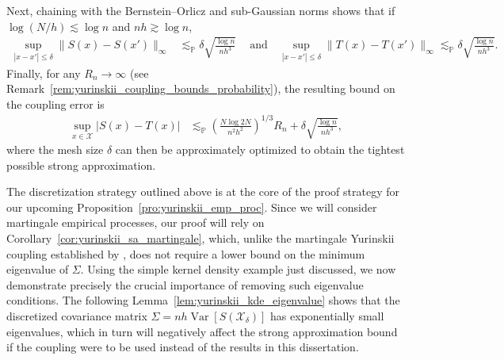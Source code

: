 \documentclass[11pt,lof]{puthesis}
\renewcommand{\P}{\ensuremath{\mathbb{P}}}
\newcommand{\cX}{\ensuremath{\mathcal{X}}}
\DeclareMathOperator{\Var}{Var}
\theoremstyle{break}
\theoremstyle{proof}
\begin{document}
Next, chaining with the Bernstein--Orlicz and sub-Gaussian norms
\citep[Section~2.2]{van1996weak} shows that if
$\log(N/h) \lesssim \log n$ and $n h \gtrsim \log n$,
%
\begin{align*}
  \sup_{|x-x'| \leq \delta}
  \big\|S(x) - S(x') \big\|_\infty
  &\lesssim_\P
  \delta
  \sqrt{\frac{\log n}{n h^3}} \ \quad\text{and}\quad
  \sup_{|x-x'| \leq \delta}
  \big\|T(x) - T(x')\big\|_\infty
  \lesssim_\P
  \delta
  \sqrt{\frac{\log n}{n h^3}}.
\end{align*}
%
Finally, for any $R_n\to\infty$
(see Remark~\ref{rem:yurinskii_coupling_bounds_probability}),
the resulting bound on the coupling error is
%
\begin{align*}
  \sup_{x \in \cX}
  \big| S(x) - T(x) \big|
  &\lesssim_\P
  \left( \frac{N \log 2N}{n^2 h^2} \right)^{1/3} R_n
  + \delta \sqrt{\frac{\log n}{n h^3}},
\end{align*}
%
where the mesh size $\delta$ can then be approximately
optimized to obtain the tightest possible strong approximation.

The discretization strategy outlined above is at the core of the proof strategy
for our upcoming Proposition~\ref{pro:yurinskii_emp_proc}. Since we will
consider
martingale empirical processes, our proof will rely on
Corollary~\ref{cor:yurinskii_sa_martingale}, which, unlike the martingale
Yurinskii
coupling established by \citet{li2020uniform}, does not require a lower bound
on the minimum eigenvalue of $\Sigma$. Using the simple kernel density example
just discussed, we now demonstrate precisely the crucial importance of removing
such eigenvalue conditions. The following
Lemma~\ref{lem:yurinskii_kde_eigenvalue} shows
that the discretized covariance matrix $\Sigma = n h\Var[S(\cX_\delta)]$ has
exponentially small eigenvalues, which in turn will negatively affect the
strong approximation bound if the \citet{li2020uniform} coupling were to be
used instead of the results in this dissertation.
\end{document}
